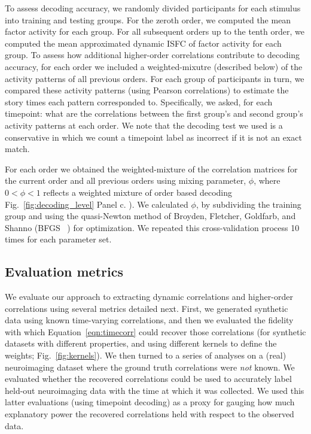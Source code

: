 To assess decoding accuracy, we randomly divided participants for each
stimulus into training and testing groups. For the zeroth order, we
computed the mean factor activity for each group.  For all subsequent
orders up to the tenth order, we computed the mean approximated
dynamic ISFC of factor activity for each group. To assess how
additional higher-order correlations contribute to decoding accuracy,
for each order we included a weighted-mixutre (described below) of the activity patterns of all
previous orders.  For each group of participants in turn, we compared these activity patterns (using Pearson correlations) to estimate the story times each pattern corresponded to. Specifically, we asked, for each timepoint: what are the correlations
between the first group's and second group's activity patterns at each
order. We note that the decoding test we used is a conservative in which we count a timepoint label as incorrect if it is not an exact match.

For each order we obtained the weighted-mixture of the correlation
matrices for the current order and all previous orders using mixing parameter, $\phi$, where $0 <\phi< 1$ reflects a
weighted mixture of order based decoding Fig.~\ref{fig:decoding_level}
Panel c. ). We calculated  $\phi$, by
subdividing the training group and using the quasi-Newton method of
Broyden, Fletcher, Goldfarb, and Shanno (BFGS ~\citep{NoceWrig06}) for optimization. We
repeated this cross-validation process 10 times for each parameter set. 














\subsection*{Evaluation metrics}
We evaluate our approach to extracting dynamic correlations and
higher-order correlations using several metrics detailed next.  First,
we generated synthetic data using known time-varying correlations, and
then we evaluated the fidelity with which Equation~\ref{eqn:timecorr}
could recover those correlations (for synthetic datasets with
different properties, and using different kernels to define the
weights; Fig.~\ref{fig:kernels}).  We then turned to a series of
analyses on a (real) neuroimaging dataset where the ground truth
correlations were \textit{not} known.  We evaluated whether the
recovered correlations could be used to accurately label held-out
neuroimaging data with the time at which it was collected.  We used this latter evaluations (using timepoint
decoding) as a proxy for
gauging how much explanatory power the recovered correlations held
with respect to the observed data.

